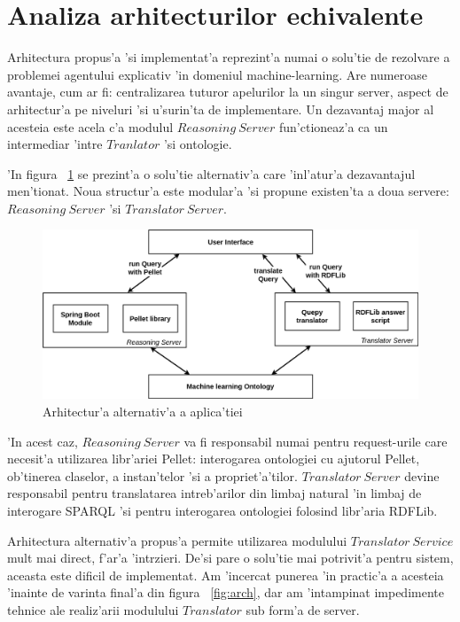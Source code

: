 \documentclass[12pt,a4paper,twoside]{report}
\begin{document}
\section{Analiza arhitecturilor echivalente}

Arhitectura propus'a 'si implementat'a reprezint'a numai o solu'tie de rezolvare a problemei agentului explicativ 'in domeniul machine-learning. Are numeroase avantaje, cum ar fi: centralizarea tuturor apelurilor la un singur server, aspect de arhitectur'a pe niveluri 'si u'surin'ta de implementare. Un dezavantaj major al acesteia este acela c'a modulul $Reasoning\ Server$ fun'ctioneaz'a ca un intermediar 'intre $Tranlator$ 'si ontologie. 

'In figura ~\ref{fig:alternative_arh} se prezint'a o solu'tie alternativ'a care 'inl'atur'a dezavantajul men'tionat. Noua structur'a este modular'a 'si propune existen'ta a doua servere: $Reasoning\ Server$ 'si $Translator\ Server$.


\begin{figure}
    \centering
    \includegraphics[width = 0.85 \linewidth]{img/arhitectura_alternativa.png}
        \caption{Arhitectur'a alternativ'a a aplica'tiei}
    \label{fig:alternative_arh}
\end{figure}

'In acest caz, $Reasoning\ Server$ va fi responsabil numai pentru request-urile care necesit'a utilizarea libr'ariei Pellet: interogarea ontologiei cu ajutorul Pellet, ob'tinerea claselor, a instan'telor 'si a propriet'a'tilor. $Translator\ Server$ devine responsabil pentru translatarea intreb'arilor din limbaj natural 'in limbaj de interogare SPARQL 'si pentru interogarea ontologiei folosind libr'aria RDFLib.

Arhitectura alternativ'a propus'a permite utilizarea modulului $Translator\ Service$ mult mai direct, f'ar'a 'int\ia rzieri. De'si pare o solu'tie mai potrivit'a pentru sistem, aceasta este dificil de implementat. Am 'incercat punerea 'in practic'a a acesteia 'inainte de varinta final'a din figura ~\ref{fig:arch}, dar am 'intampinat impedimente tehnice ale realiz'arii modulului $Translator$ sub form'a de server.
\end{document}
